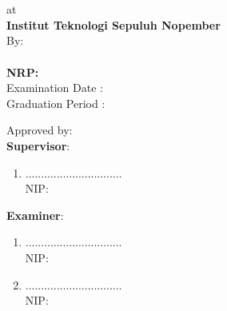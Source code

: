 { \AddToShipoutPicture*{\BackgroundIm}
	\begin{center}

		\Large\textbf{\pPengesahan}
	\end{center}
	\begin{center}
		\tsss\\
		\textbf{\ggGelar}\\
		at\\
		\textbf{Institut Teknologi Sepuluh Nopember}\\
		\vspace{1ex}
		By:\\
		\textbf{\NamaMahasiswa}\\
		\textbf{NRP: \NrpMahasiswa}\\
		\vspace{1ex}
		Examination Date : \TglUjian\\
		Graduation Period : \PerWisuda\\
		\vspace{1ex}
	\end{center}
	\begin{center}
		Approved by:\\
		\textbf{Supervisor}:
	\end{center}
	\begin{enumerate}
		\item \PbSatu \hfill ...............................\\
		      NIP:\NipPbSatu \vfill
		      \vfill
	\end{enumerate}
	\begin{center}
		\textbf{Examiner}:
	\end{center}
	\begin{enumerate}
		\item \PjSatu \hfill ...............................\\
		      NIP:\NipPjSatu
		      \vfill
		\item \PjDua \hfill ...............................\\
		      NIP:\NipPjDua\vfill
\end{enumerate}}
